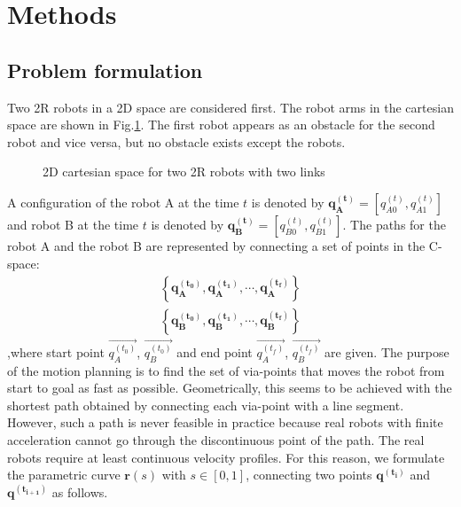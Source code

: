\documentclass[12pt]{article} %
\begin{document}
\section{Methods}

\subsection{Problem formulation}
Two 2R robots in a 2D space are considered first. The robot arms in the cartesian space are shown in Fig.\ref{fig:cartesian}. The first robot appears as an obstacle for the second robot and vice versa, but no obstacle exists except the robots. 

\begin{figure}[H] %
\caption{2D cartesian space for two 2R robots with two links}
\label{fig:cartesian}
\end{figure}

A configuration of the robot A at the time $t$ is denoted by $\bm{q_A^{(t)}}=[q_{A0}^{(t)}, q_{A1}^{(t)}]$ and robot B at the time $t$ is denoted by $\bm{q_B^{(t)}}=[q_{B0}^{(t)}, q_{B1}^{(t)}]$. The paths for the robot A and the robot B are represented by connecting a set of points in the C-space:
\begin{eqnarray}
\left\{ \bm{q_A^{(t_0)}} , \bm{q_A^{(t_1)}}, \cdots , \bm{q_A^{(t_f)}} \right\}\\ 
\left\{ \bm{q_B^{(t_0)}} , \bm{q_B^{(t_1)}}, \cdots , \bm{q_B^{(t_f)}} \right\}
\end{eqnarray}
,where start point $\vec{q_A^{(t_0)}}$, $\vec{q_B^{(t_0)}}$ and end point $\vec{q_A^{(t_f)}}$, $\vec{q_B^{(t_f)}}$ are given. The purpose of the motion planning is to find the set of via-points that moves the robot from start to goal as fast as possible. Geometrically, this seems to be achieved with the shortest path obtained by connecting each via-point with a line segment. However, such a path is never feasible in practice because real robots with finite acceleration cannot go through the discontinuous point of the path. The real robots require at least continuous velocity profiles. For this reason, we formulate the parametric curve $\bm{r}(s)$ with $s \in [0, 1]$, connecting two points $\bm{q^{(t_i)}}$ and $\bm{q^{(t_{i+1})}}$ as follows.
\end{document}
